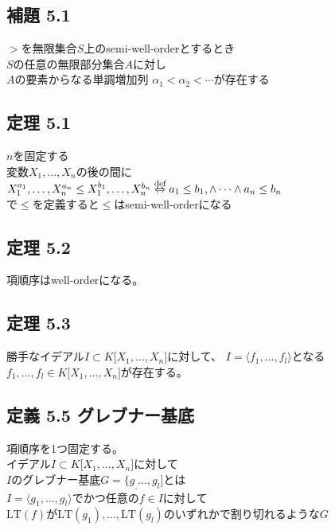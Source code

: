 \documentclass[12pt,a4paper]{article}
\begin{document}
\subsection*{補題 5.1}
  $>$を無限集合$S$上のsemi-well-orderとするとき \\
  $S$の任意の無限部分集合$A$に対し \\
  $A$の要素からなる単調増加列 $ \alpha_1 < \alpha_2 < \cdots$が存在する

\subsection*{定理 5.1}
  $n$を固定する \\
  変数$X_1 ,\ldots, X_n$の後の間に$X_1^{a_1}, \ldots, X_n^{a_n} \leq X_1^{b_1}, \ldots, X_n^{b_n} \\
  \overset{\text{def}}{\Leftrightarrow} \\
  a_1 \leq b_1, \wedge \cdots \wedge a_n \leq b_n$ \\
  で$\leq$を定義すると$\leq$はsemi-well-orderになる

\subsection*{定理 5.2}
  項順序はwell-orderになる。

\subsection*{定理 5.3}
  勝手なイデアル$I \subset K\lbrack X_1, \ldots ,X_n \rbrack$に対して、
  $I = \langle f_1, \ldots,f_l \rangle$となる$f_1 ,\ldots , f_l \in K\lbrack X_1,\ldots,X_n \rbrack$が存在する。

\subsection*{定義 5.5 グレブナー基底}
  項順序を1つ固定する。 \\
  イデアル$I \subset K \lbrack X_1, \ldots, X_n \rbrack$に対して \\
  $I$のグレブナー基底$G = \lbrace g_, \ldots , g_l \rbrack$とは \\
  $I= \langle g_1, \ldots , g_l \rangle$でかつ任意の$f \in I$に対して \\
  $\text{LT}(f)$が$\text{LT}(g_1), \ldots, \text{LT}(g_l)$のいずれかで割り切れるような$G$
\end{document}
